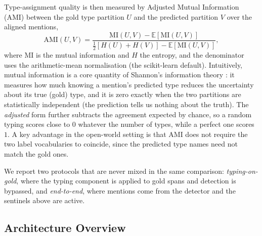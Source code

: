 Type-assignment quality is then measured by Adjusted Mutual Information (AMI) \cite{vinh2010ami} between the gold type partition $U$ and the predicted partition $V$ over the aligned mentions,
\begin{equation}
\mathrm{AMI}(U,V)=\frac{\mathrm{MI}(U,V)-\mathbb{E}\!\left[\mathrm{MI}(U,V)\right]}{\tfrac12\!\left[H(U)+H(V)\right]-\mathbb{E}\!\left[\mathrm{MI}(U,V)\right]},
\end{equation}
where $\mathrm{MI}$ is the mutual information and $H$ the entropy, and the denominator uses the arithmetic-mean normalisation (the scikit-learn default). Intuitively, mutual information is a core quantity of Shannon's information theory \cite{shannon1948}: it measures how much knowing a mention's predicted type reduces the uncertainty about its true (gold) type, and it is zero exactly when the two partitions are statistically independent (the prediction tells us nothing about the truth). The \emph{adjusted} form further subtracts the agreement expected by chance, so a random typing scores close to $0$ whatever the number of types, while a perfect one scores $1$. A key advantage in the open-world setting is that AMI does not require the two label vocabularies to coincide, since the predicted type names need not match the gold ones.

We report two protocols that are never mixed in the same comparison: \emph{typing-on-gold}, where the typing component is applied to gold spans and detection is bypassed, and \emph{end-to-end}, where mentions come from the detector and the sentinels above are active.

\subsection{Architecture Overview}
\label{sec:method:overview}

